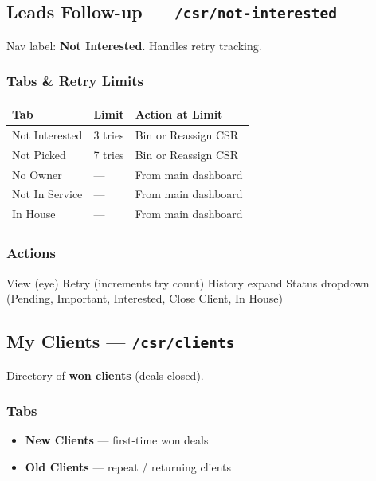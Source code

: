 \documentclass[11pt,a4paper]{article}
\begin{document}
\subsection{Leads Follow-up --- \texttt{/csr/not-interested}}

Nav label: \textbf{Not Interested}. Handles retry tracking.

\subsubsection{Tabs \& Retry Limits}
\begin{longtable}{@{}p{4cm}p{3cm}p{7cm}@{}}
\toprule
\textbf{Tab} & \textbf{Limit} & \textbf{Action at Limit} \\
\midrule
Not Interested  & 3 tries & Bin or Reassign CSR \\
Not Picked      & 7 tries & Bin or Reassign CSR \\
No Owner        & ---     & From main dashboard \\
Not In Service  & ---     & From main dashboard \\
In House        & ---     & From main dashboard \\
\bottomrule
\end{longtable}

\subsubsection{Actions}
View (eye) \textbar{} Retry (increments try count) \textbar{} History expand \textbar{} Status dropdown (Pending, Important, Interested, Close Client, In House)


\subsection{My Clients --- \texttt{/csr/clients}}

Directory of \textbf{won clients} (deals closed).

\subsubsection{Tabs}
\begin{itemize}[noitemsep]
    \item \textbf{New Clients} --- first-time won deals
    \item \textbf{Old Clients} --- repeat / returning clients
\end{itemize}
\end{document}
